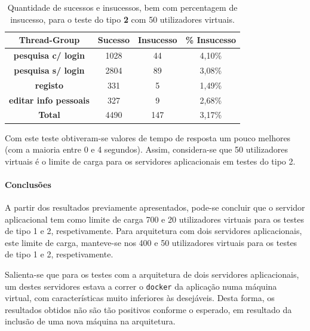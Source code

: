 \begin{table}[H]
\centering
\caption{Quantidade de sucessos e insucessos, bem com percentagem de insucesso, para o teste do tipo \textbf{2} com 50 utilizadores virtuais.}
\begin{tabular}{cccc}
\hline
\rowcolor[HTML]{EFEFEF} 
\textbf{Thread-Group}                  & \textbf{Sucesso} & \textbf{Insucesso} & \textbf{\% Insucesso} \\ \hline
\textbf{pesquisa c/ login}             & 1028             & 44                 & 4,10\%                \\
\textbf{pesquisa s/ login}             & 2804             & 89                 & 3,08\%                \\
\textbf{registo}                       & 331              & 5                  & 1,49\%                \\
\textbf{editar info pessoais}          & 327              & 9                  & 2,68\%                \\ \hline
\cellcolor[HTML]{EFEFEF}\textbf{Total} & 4490             & 147                & 3,17\%                \\ \hline
\end{tabular}
\end{table}


Com este teste obtiveram-se valores de tempo de resposta um pouco melhores (com a maioria entre 0 e 4 segundos). Assim, considera-se que 50 utilizadores virtuais é o limite de carga para os servidores aplicacionais em testes do tipo 2.

\paragraph{Conclusões}

A partir dos resultados previamente apresentados, pode-se concluir que o servidor aplicacional tem como limite de carga 700 e 20 utilizadores virtuais para os testes de tipo 1 e 2, respetivamente. Para arquitetura com dois servidores aplicacionais, este limite de carga, manteve-se nos 400 e 50 utilizadores virtuais para os testes de tipo 1 e 2, respetivamente.

Salienta-se que para os testes com a arquitetura de dois servidores aplicacionais, um destes servidores estava a correr o \texttt{docker} da aplicação numa máquina virtual, com características muito inferiores às desejáveis. Desta forma, os resultados obtidos não são tão positivos conforme o esperado, em resultado da inclusão de uma nova máquina na arquitetura.

